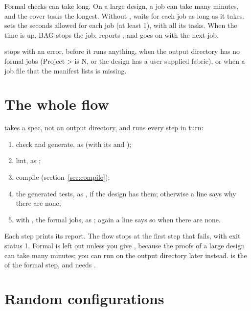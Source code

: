 Formal checks can take long. On a large design, a job can take many minutes, and the
cover tasks the longest. Without ,  waits for each job as
long as it takes.  sets the seconds allowed for each job (at least 1),
with all its tasks. When the time is up, BAG stops the job, reports , and goes on with the next job.

 stops with an error, before it runs anything, when the output directory
has no formal jobs (Project >  is N, or the design
has a user-supplied fabric), or when a job file that the manifest lists is missing.

\section{The whole flow}
\label{sec:flow}

 takes a spec, not an output directory, and runs every step in turn:

\begin{enumerate}
\item check and generate, as  (with its  and );
\item lint, as ;
\item compile (section~\ref{sec:compile});
\item the generated tests, as , if the design has them; otherwise a line
  says why there are none;
\item with , the formal jobs, as ; again a line says so when
  there are none.
\end{enumerate}

Each step prints its report. The flow stops at the first step that fails, with exit
status 1. Formal is left out unless you give , because the proofs of a
large design can take many minutes; you can run  on the output directory
later instead.  is the  of the formal step, and needs
.



\section{Random configurations}
\label{sec:regress}

